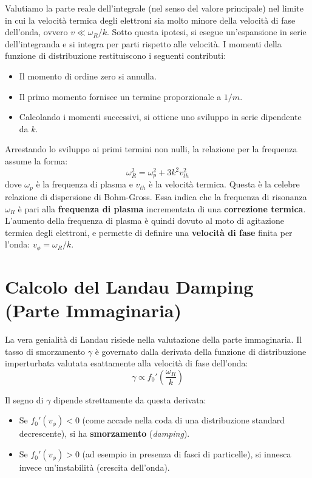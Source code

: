Valutiamo la parte reale dell'integrale (nel senso del valore principale) nel limite in cui la velocità termica degli elettroni sia molto minore della velocità di fase dell'onda, ovvero $v \ll \omega_R/k$.
Sotto questa ipotesi, si esegue un'espansione in serie dell'integranda e si integra per parti rispetto alle velocità. I momenti della funzione di distribuzione restituiscono i seguenti contributi:
\begin{itemize}
\item Il momento di ordine zero si annulla.
\item Il primo momento fornisce un termine proporzionale a $1/m$.
\item Calcolando i momenti successivi, si ottiene uno sviluppo in serie dipendente da $k$.
\end{itemize}

Arrestando lo sviluppo ai primi termini non nulli, la relazione per la frequenza assume la forma:
\begin{equation}
\omega_R^2 = \omega_p^2 + 3 k^2 v_{th}^2
\end{equation}
dove $\omega_p$ è la frequenza di plasma e $v_{th}$ è la velocità termica.
Questa è la celebre relazione di dispersione di Bohm-Gross. Essa indica che la frequenza di risonanza $\omega_R$ è pari alla \textbf{frequenza di plasma} incrementata di una \textbf{correzione termica}. L'aumento della frequenza di plasma è quindi dovuto al moto di agitazione termica degli elettroni, e permette di definire una \textbf{velocità di fase} finita per l'onda: $v_\phi = \omega_R / k$.

\section{Calcolo del Landau Damping (Parte Immaginaria)}

La vera genialità di Landau risiede nella valutazione della parte immaginaria. Il tasso di smorzamento $\gamma$ è governato dalla derivata della funzione di distribuzione imperturbata valutata esattamente alla velocità di fase dell'onda:
\begin{equation}
\gamma \propto f_0'\left(\frac{\omega_R}{k}\right)
\end{equation}

Il segno di $\gamma$ dipende strettamente da questa derivata:
\begin{itemize}
\item Se $f_0'(v_\phi) < 0$ (come accade nella coda di una distribuzione standard decrescente), si ha \textbf{smorzamento} (\textit{damping}).
\item Se $f_0'(v_\phi) > 0$ (ad esempio in presenza di fasci di particelle), si innesca invece un'instabilità (crescita dell'onda).
\end{itemize}

